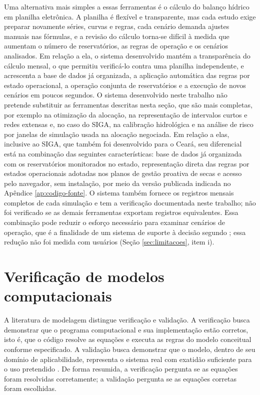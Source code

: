Uma alternativa mais simples a essas ferramentas é o cálculo do balanço hídrico em planilha eletrônica. A planilha é flexível e transparente, mas cada estudo exige preparar novamente séries, curvas e regras, cada cenário demanda ajustes manuais nas fórmulas, e a revisão do cálculo torna-se difícil à medida que aumentam o número de reservatórios, as regras de operação e os cenários analisados. Em relação a ela, o sistema desenvolvido mantém a transparência do cálculo mensal, o que permitiu verificá-lo contra uma planilha independente, e acrescenta a base de dados já organizada, a aplicação automática das regras por estado operacional, a operação conjunta de reservatórios e a execução de novos cenários em poucos segundos. O sistema desenvolvido neste trabalho não pretende substituir as ferramentas descritas nesta seção, que são mais completas, por exemplo na otimização da alocação, na representação de intervalos curtos e redes extensas e, no caso do SIGA, na calibração hidrológica e na análise de risco por janelas de simulação usada na alocação negociada. Em relação a elas, inclusive ao SIGA, que também foi desenvolvido para o Ceará, seu diferencial está na combinação das seguintes características: base de dados já organizada com os reservatórios monitorados no estado, representação direta das regras por estados operacionais adotadas nos planos de gestão proativa de secas e acesso pelo navegador, sem instalação, por meio da versão publicada indicada no Apêndice \ref{ap:codigo-fonte}. O sistema também fornece os registros mensais completos de cada simulação e tem a verificação documentada neste trabalho; não foi verificado se as demais ferramentas exportam registros equivalentes. Essa combinação pode reduzir o esforço necessário para examinar cenários de operação, que é a finalidade de um sistema de suporte à decisão segundo ; essa redução não foi medida com usuários (Seção \ref{sec:limitacoes}, item i).

\section{Verificação de modelos computacionais}
\label{sec:verificacao-modelos}

A literatura de modelagem distingue verificação e validação. A verificação busca demonstrar que o programa computacional e sua implementação estão corretos, isto é, que o código resolve as equações e executa as regras do modelo conceitual conforme especificado. A validação busca demonstrar que o modelo, dentro de seu domínio de aplicabilidade, representa o sistema real com exatidão suficiente para o uso pretendido \cite{refsgaardHenriksen2004,sargent2013}. De forma resumida, a verificação pergunta se as equações foram resolvidas corretamente; a validação pergunta se as equações corretas foram escolhidas.

